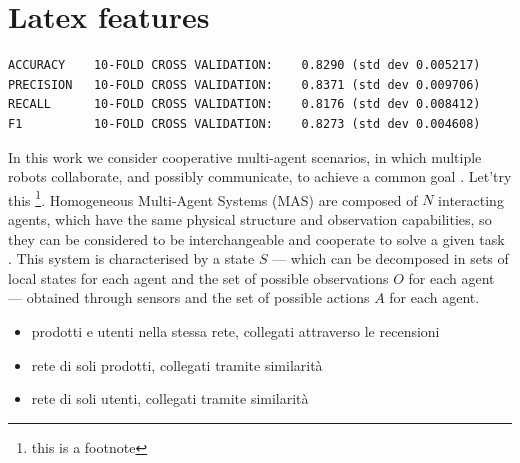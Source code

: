 

\chapter{Latex features}
\label{chap:test}


\begin{verbatim}
ACCURACY    10-FOLD CROSS VALIDATION:    0.8290 (std dev 0.005217)
PRECISION   10-FOLD CROSS VALIDATION:    0.8371 (std dev 0.009706)
RECALL      10-FOLD CROSS VALIDATION:    0.8176 (std dev 0.008412)
F1          10-FOLD CROSS VALIDATION:    0.8273 (std dev 0.004608)
\end{verbatim}

In this work we consider cooperative multi-agent scenarios, in which multiple 
robots collaborate, and possibly communicate, to achieve a common goal 
\cite[][]{ismail2018survey}. Let'try this \footnote{this is a footnote}.
Homogeneous Multi-Agent Systems (MAS) are composed of $N$ interacting 
agents, which have the same physical structure and observation capabilities, so 
they can be considered to be interchangeable and cooperate to solve a given 
task \cite[][]{stone2000multiagent, vsovsic2016inverse}.
This system is characterised by a state $S$ — which can be decomposed in sets of 
local states for each agent and the set of possible observations $O$ for each agent 
— obtained through sensors and the set of possible actions  $A$ for each agent.

\begin{itemize}
	\item prodotti e utenti nella stessa rete, collegati attraverso le recensioni
	\item rete di soli prodotti, collegati tramite similarità
	\item rete di soli utenti, collegati tramite similarità
\end{itemize}

